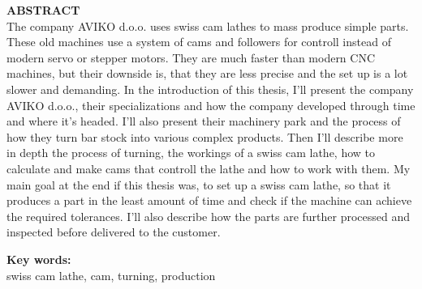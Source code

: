 \newpage
\textbf{\fontsize{14}{21}\selectfont ABSTRACT} \\
The company AVIKO d.o.o. uses swiss cam lathes to mass produce
simple parts. These old machines use a system of cams and followers
for controll instead of modern servo or stepper motors. They are
much faster than modern CNC machines, but their downside is, 
that they are less precise and the set up is a lot slower and demanding.
In the introduction of this thesis, I'll present the company 
AVIKO d.o.o., their specializations and how the company developed
through time and where it's headed. I'll also present their 
machinery park and the process of how they turn bar stock into 
various complex products. Then I'll describe more in depth the
process of turning, the workings of a swiss cam lathe, how to 
calculate and make cams that controll the lathe and how to work
with them. My main goal at the end if this thesis was, to set up
a swiss cam lathe, so that it produces a part in the least amount 
of time and check if the machine can achieve the required
tolerances. I'll also describe how the parts are further processed
and inspected before delivered to the customer.

\textbf{\fontsize{14}{21}\selectfont Key words:} \\
\fontsize{12}{16}swiss cam lathe, cam, turning, production